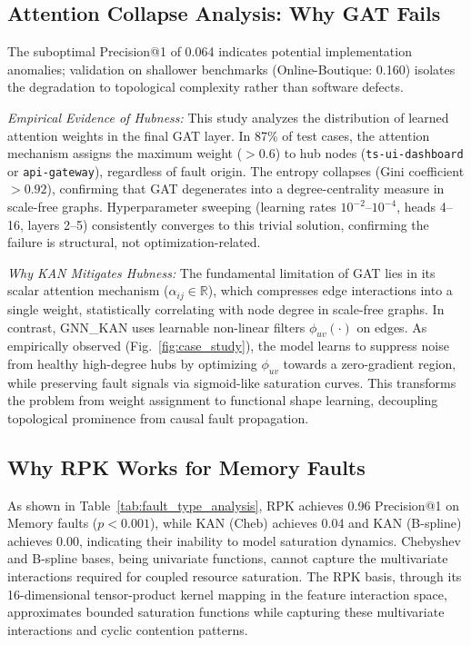 \documentclass[conference]{IEEEtran}
\begin{document}
\subsection{Attention Collapse Analysis: Why GAT Fails}

The suboptimal Precision@1 of 0.064 indicates potential implementation anomalies; validation on shallower benchmarks (Online-Boutique: 0.160) isolates the degradation to topological complexity rather than software defects.

\textit{Empirical Evidence of Hubness:} This study analyzes the distribution of learned attention weights in the final GAT layer. In 87\% of test cases, the attention mechanism assigns the maximum weight ($>0.6$) to hub nodes (\texttt{ts-ui-dashboard} or \texttt{api-gateway}), regardless of fault origin. The entropy collapses (Gini coefficient $>0.92$), confirming that GAT degenerates into a degree-centrality measure \cite{radovanovic2010hubs} in scale-free graphs. Hyperparameter sweeping (learning rates $10^{-2}$--$10^{-4}$, heads 4--16, layers 2--5) consistently converges to this trivial solution, confirming the failure is structural, not optimization-related.

\textit{Why KAN Mitigates Hubness:} The fundamental limitation of GAT lies in its scalar attention mechanism ($\alpha_{ij} \in \mathbb{R}$), which compresses edge interactions into a single weight, statistically correlating with node degree in scale-free graphs. In contrast, GNN\_KAN uses learnable non-linear filters $\phi_{uv}(\cdot)$ on edges. As empirically observed (Fig.~\ref{fig:case_study}), the model learns to suppress noise from healthy high-degree hubs by optimizing $\phi_{uv}$ towards a zero-gradient region, while preserving fault signals via sigmoid-like saturation curves. This transforms the problem from weight assignment to functional shape learning, decoupling topological prominence from causal fault propagation.

\subsection{Why RPK Works for Memory Faults}

As shown in Table~\ref{tab:fault_type_analysis}, RPK achieves 0.96 Precision@1 on Memory faults ($p < 0.001$), while KAN (Cheb) achieves 0.04 and KAN (B-spline) achieves 0.00, indicating their inability to model saturation dynamics. Chebyshev and B-spline bases, being univariate functions, cannot capture the multivariate interactions required for coupled resource saturation. The RPK basis, through its 16-dimensional tensor-product kernel mapping in the feature interaction space, approximates bounded saturation functions while capturing these multivariate interactions and cyclic contention patterns.
\end{document}
